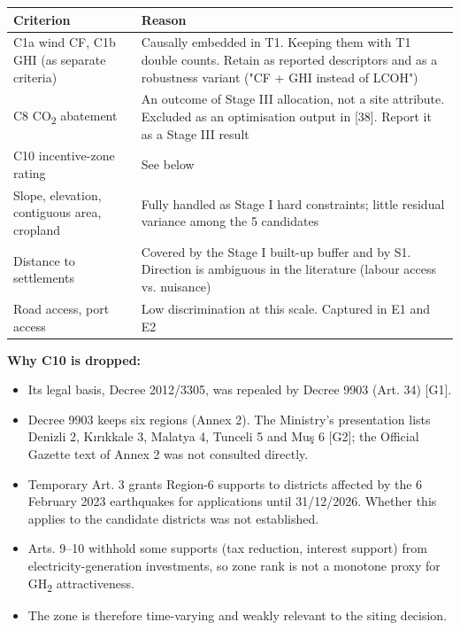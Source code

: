 \documentclass[11pt,a4paper]{article}
\begin{document}
\begin{center}\footnotesize
\begin{tabularx}{\textwidth}{>{\hsize=0.450\hsize\raggedright\arraybackslash}X>{\hsize=1.550\hsize\raggedright\arraybackslash}X}
\toprule
\textbf{Criterion} & \textbf{Reason} \\
\midrule
C1a wind CF, C1b GHI (as separate criteria) & Causally embedded in T1. Keeping them with T1 double counts. Retain as reported descriptors and as a robustness variant ("CF + GHI instead of LCOH") \\
C8 CO\textsubscript{2} abatement & An outcome of Stage III allocation, not a site attribute. Excluded as an optimisation output in [38]. Report it as a Stage III result \\
C10 incentive-zone rating & See below \\
Slope, elevation, contiguous area, cropland & Fully handled as Stage I hard constraints; little residual variance among the 5 candidates \\
Distance to settlements & Covered by the Stage I built-up buffer and by S1. Direction is ambiguous in the literature (labour access vs. nuisance) \\
Road access, port access & Low discrimination at this scale. Captured in E1 and E2 \\
\bottomrule
\end{tabularx}
\end{center}

\textbf{Why C10 is dropped:}

\begin{itemize}\setlength\itemsep{1pt}

  \item Its legal basis, Decree 2012/3305, was repealed by Decree 9903 (Art. 34) [G1].

  \item Decree 9903 keeps six regions (Annex 2). The Ministry's presentation lists Denizli 2, Kırıkkale 3, Malatya 4, Tunceli 5 and Muş 6 [G2]; the Official Gazette text of Annex 2 was not consulted directly.

  \item Temporary Art. 3 grants Region-6 supports to districts affected by the 6 February 2023 earthquakes for applications until 31/12/2026. Whether this applies to the candidate districts was not established.

  \item Arts. 9--10 withhold some supports (tax reduction, interest support) from electricity-generation investments, so zone rank is not a monotone proxy for GH\textsubscript{2} attractiveness.

  \item The zone is therefore time-varying and weakly relevant to the siting decision.

\end{itemize}
\end{document}
